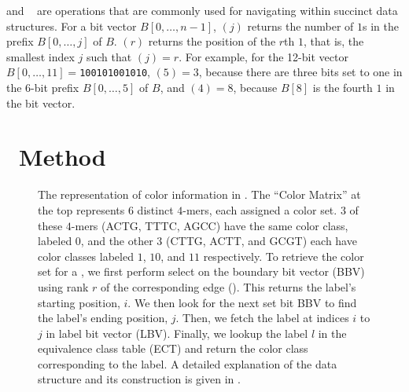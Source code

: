 
 and ~\cite{Jacobson89} are operations that are commonly
used for navigating within succinct data structures. For a bit vector
$B[0,\ldots,n-1]$, \rank$(j)$ returns the number of $1$s in the prefix
$B[0,\ldots,j]$ of $B$. \select$(r)$ returns the position of the $r$th $1$, that
is, the smallest index $j$ such that \rank$(j)=r$. For example, for the 12-bit
vector $B[0,\ldots,11]=$\texttt{100101001010}, \rank$(5)=3$, because there are
three bits set to one in the 6-bit prefix $B[0,\ldots,5]$ of $B$, and
\select$(4)=8$, because $B[8]$ is the fourth $1$ in the bit vector.

\section{~Method}
\label{method}

\begin{figure}[t]
  \centering
  \resizebox{0.70\linewidth}{!}{
      
    }
  \caption{
    The representation of color information in \system. The ``Color Matrix'' at
    the top represents $6$ distinct $4$-mers, each assigned a color set. $3$ of
    these $4$-mers (ACTG, TTTC, AGCC) have the same color class, labeled $0$,
    and the other $3$ (CTTG, ACTT, and GCGT) each have color classes labeled
    $1$, $10$, and $11$ respectively. To retrieve the color set for a \kmer, we
    first perform select on the boundary bit vector (BBV) using rank $r$ of the
    corresponding edge (\kmer). This returns the label's starting position, $i$.
    We then look for the next set bit BBV to find the label's ending position,
    $j$. Then, we fetch the label at indices $i$ to $j$ in label bit vector
    (LBV). Finally, we lookup the label $l$ in the equivalence class table (ECT)
    and return the color class corresponding to the label. A detailed
    explanation of the data structure and its construction is given in
    .
  }
    \label{fig:cdbg-rep}
\end{figure}

